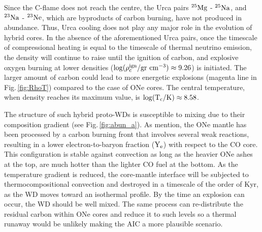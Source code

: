 \documentclass[../../main/thesis_msc.tex]{subfiles}
\begin{document}
        Since the C-flame does not reach the centre, the Urca pairs $\rm ^{25}Mg$ - $\rm ^{25}Na$, and $\rm ^{23}Na$ - $\rm ^{23}Ne$, which are byproducts of carbon burning, have not produced in abundance. Thus, Urca cooling does not play any major role in the evolution of hybrid cores. In the absence of the aforementioned Urca pairs, once the timescale of compressional heating is equal to the timescale of thermal neutrino emission, the density will continue to raise until the ignition of carbon, and explosive oxygen burning at lower densities ($\rm \log(\rho_c^{\rm ign} / \rm gr \ cm^{-3}) \approx 9.26$) is initiated. The larger amount of carbon could lead to more energetic explosions (magenta line in Fig.\,\ref{fig:RhoT}) compared to the case of ONe cores. The central temperature, when density reaches its maximum value, is $\rm \log(T_c / \rm K) \approx 8.58$.
        
        The structure of such hybrid proto-WDs is susceptible to mixing due to their composition gradient (see Fig.\,\ref{fig:abun_a}). As \cite{brooks2017} mention, the ONe mantle has been processed by a carbon burning front that involves several weak reactions, resulting in a lower electron-to-baryon fraction ($\rm Y_e$) with respect to the CO core. This configuration is stable against convection as long as the heavier ONe ashes at the top, are much hotter than the lighter CO fuel at the bottom. As the temperature gradient is reduced, the core-mantle interface will be subjected to thermocompositional convection and destroyed in a timescale of the order of Kyr, as the WD moves toward an isothermal profile. By the time an explosion can occur, the WD should be well mixed. The same process can re-distribute the residual carbon within ONe cores and reduce it to such levels so a thermal runaway would be unlikely making the AIC a more plausible scenario.
\end{document}
